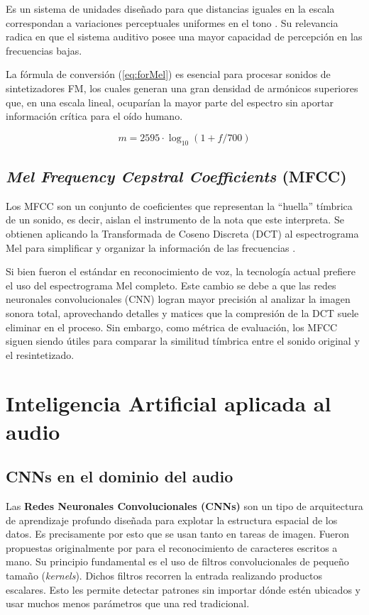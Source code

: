 Es un sistema de unidades diseñado para que distancias iguales en la escala correspondan a variaciones perceptuales uniformes en el tono \citep{stevens1937}. Su relevancia radica en que el sistema auditivo posee una mayor capacidad de percepción en las frecuencias bajas. 

La fórmula de conversión (\ref{eq:forMel}) es esencial para procesar sonidos de sintetizadores FM, los cuales generan una gran densidad de armónicos superiores que, en una escala lineal, ocuparían la mayor parte del espectro sin aportar información crítica para el oído humano.

\begin{equation}
m = 2595 \cdot \log_{10}(1 + f/700)
\label{eq:forMel}
\end{equation}

\subsection{\textit{Mel Frequency Cepstral Coefficients} (MFCC)}
\label{sec:MFCC}

Los MFCC son un conjunto de coeficientes que representan la ``huella'' tímbrica de un sonido, es decir, aislan el instrumento de la nota que este interpreta. Se obtienen aplicando la Transformada de Coseno Discreta (DCT) al espectrograma Mel para simplificar y organizar la información de las frecuencias \citep{davis1980}. 

Si bien fueron el estándar en reconocimiento de voz, la tecnología actual prefiere el uso del espectrograma Mel completo. Este cambio se debe a que las redes neuronales convolucionales (CNN) logran mayor precisión al analizar la imagen sonora total, aprovechando detalles y matices que la compresión de la DCT suele eliminar en el proceso. Sin embargo, como métrica de evaluación, los MFCC siguen siendo útiles para comparar la similitud tímbrica entre el sonido original y el resintetizado.

\section{Inteligencia Artificial aplicada al audio}

\subsection{CNNs en el dominio del audio}

Las \textbf{Redes Neuronales Convolucionales (CNNs)} son un tipo de arquitectura de aprendizaje profundo diseñada para explotar la estructura espacial de los datos. Es precisamente por esto que se usan tanto en tareas de imagen. Fueron propuestas originalmente por \citep{lecun1998} para el reconocimiento de caracteres escritos a mano. Su principio fundamental es el uso de filtros convolucionales de pequeño tamaño (\textit{kernels}). Dichos filtros recorren la entrada realizando productos escalares. Esto les permite detectar patrones sin importar dónde estén ubicados y usar muchos menos parámetros que una red tradicional.

